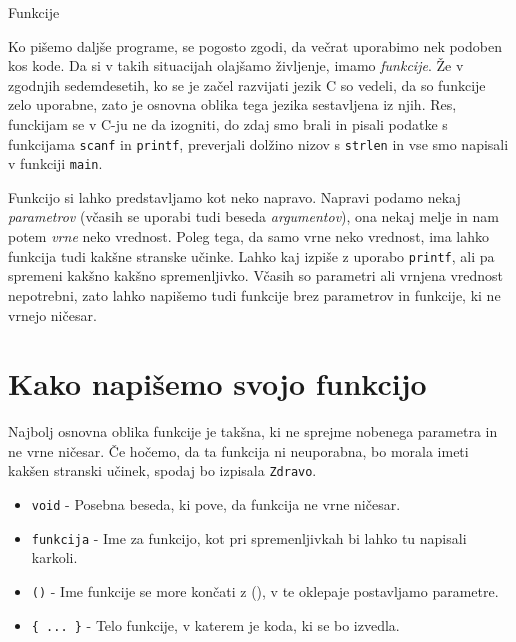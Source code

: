 
Funkcije

Ko pišemo daljše programe, se pogosto zgodi, da večrat uporabimo nek podoben
kos kode. Da si v takih situacijah olajšamo življenje, imamo \emph{funkcije}.
Že v zgodnjih sedemdesetih, ko se je začel razvijati jezik C so vedeli, da so
funkcije zelo uporabne, zato je osnovna oblika tega jezika sestavljena iz njih.
Res, funckijam se v C-ju ne da izogniti, do zdaj smo brali in pisali podatke s
funkcijama \verb+scanf+ in \verb+printf+, preverjali dolžino nizov s
\verb+strlen+ in vse smo napisali v funkciji \verb+main+.

Funkcijo si lahko predstavljamo kot neko napravo. Napravi podamo nekaj
\emph{parametrov} (včasih se uporabi tudi beseda \emph{argumentov}), ona nekaj
melje in nam potem \emph{vrne} neko vrednost. Poleg tega, da samo vrne neko
vrednost, ima lahko funkcija tudi kakšne stranske učinke. Lahko kaj izpiše z
uporabo \verb+printf+, ali pa spremeni kakšno kakšno spremenljivko. Včasih so
parametri ali vrnjena vrednost nepotrebni, zato lahko napišemo tudi funkcije
brez parametrov in funkcije, ki ne vrnejo ničesar.


\section{Kako napišemo svojo funkcijo}

Najbolj osnovna oblika funkcije je takšna, ki ne sprejme nobenega parametra in
ne vrne ničesar. Če hočemo, da ta funkcija ni neuporabna, bo morala imeti
kakšen stranski učinek, spodaj bo izpisala \verb+Zdravo+.

\begin{examples}
\end{examples}

\begin{itemize}
    \item \verb+void+ - Posebna beseda, ki pove, da funkcija ne vrne ničesar.
    \item \verb+funkcija+ - Ime za funkcijo, kot pri spremenljivkah bi lahko tu
        napisali karkoli.
    \item \verb+()+ - Ime funkcije se more končati z (), v te oklepaje
        postavljamo parametre.
    \item \verb+{ ... }+ - Telo funkcije, v katerem je koda, ki se bo izvedla.
\end{itemize}

